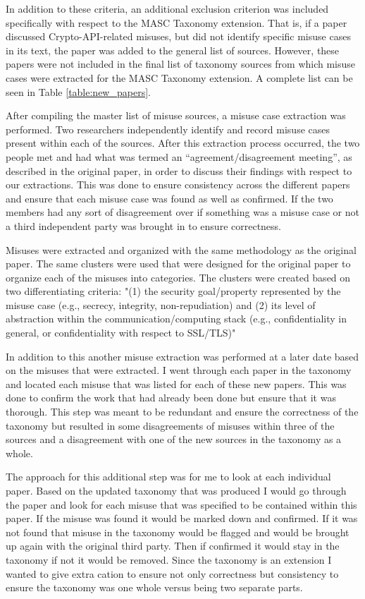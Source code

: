 In addition to these criteria, an additional exclusion criterion was included specifically with respect to the MASC Taxonomy extension.  That is, if a paper discussed Crypto-API-related misuses, but did not identify specific misuse cases in its text, the paper was added to the general list of sources.  However, these papers were not included in the final list of taxonomy sources from which misuse cases were extracted for the MASC Taxonomy extension. A complete list can be seen in Table \ref{table:new_papers}.



After compiling the master list of misuse sources, a misuse case extraction was performed. Two researchers independently identify and record misuse cases present within each of the sources. After this extraction process occurred, the two people  met and had what was termed an “agreement/disagreement meeting”, as described in the original paper, in order to discuss their findings with respect to our extractions.  This was done to ensure consistency across the different papers and ensure that each misuse case was found as well as confirmed. If the two members had any sort of disagreement over if something was a misuse case or not a third independent party was brought in to ensure correctness. 

Misuses were extracted and organized with the same methodology as the original paper. The same clusters were used that were designed for the original paper to organize each of the misuses into categories. The clusters were created based on two differentiating criteria: "(1) the security goal/property represented by the misuse case  (e.g., secrecy, integrity, non-repudiation) and (2) its level of abstraction within the communication/computing stack (e.g., confidentiality in general, or confidentiality with respect to SSL/TLS)"
    
In addition to this another misuse extraction was performed at a later date based on the misuses that were extracted. I went through each paper in the taxonomy and located each misuse that was listed for each of these new papers. This was done to confirm the work that had already been done but ensure that it was thorough. This step was meant to be redundant and ensure the correctness of the taxonomy but resulted in some disagreements of misuses within three of the sources and a disagreement with one of the new sources in the taxonomy as a whole. 

The approach for this additional step was for me to look at each individual paper. Based on the updated taxonomy that was produced I would go through the paper and look for each misuse that was specified to be contained within this paper. If the misuse was found it would be marked down and confirmed. If it was not found that misuse in the taxonomy would be flagged and would be brought up again with the original third party. Then if confirmed it would stay in the taxonomy if not it would be removed. Since the taxonomy is an extension I wanted to give extra cation to ensure not only correctness but consistency to ensure the taxonomy was one whole versus being two separate parts.
  
